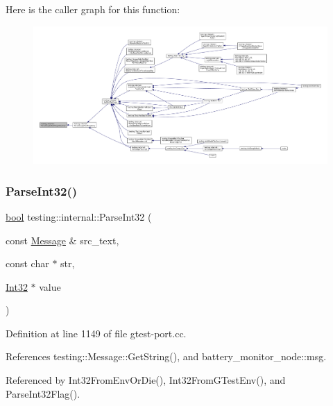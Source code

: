 Here is the caller graph for this function\+:
\nopagebreak
\begin{figure}[H]
\begin{center}
\leavevmode
\includegraphics[width=350pt]{namespacetesting_1_1internal_ae4c46ce8c3d016848fff52cc5133f2ac_icgraph}
\end{center}
\end{figure}
\mbox{\label{namespacetesting_1_1internal_ac06fc81336a3d80755f4020d34321766}} 
\subsubsection{\texorpdfstring{Parse\+Int32()}{ParseInt32()}}
{\footnotesize\ttfamily \hyperlink{classbool}{bool} testing\+::internal\+::\+Parse\+Int32 (\begin{DoxyParamCaption}\item[{const \hyperlink{classtesting_1_1Message}{Message} \&}]{src\+\_\+text,  }\item[{const char $\ast$}]{str,  }\item[{\hyperlink{namespacetesting_1_1internal_a8ee38faaf875f133358abaf9bc056cec}{Int32} $\ast$}]{value }\end{DoxyParamCaption})}



Definition at line 1149 of file gtest-\/port.\+cc.



References testing\+::\+Message\+::\+Get\+String(), and battery\+\_\+monitor\+\_\+node\+::msg.



Referenced by Int32\+From\+Env\+Or\+Die(), Int32\+From\+G\+Test\+Env(), and Parse\+Int32\+Flag().


